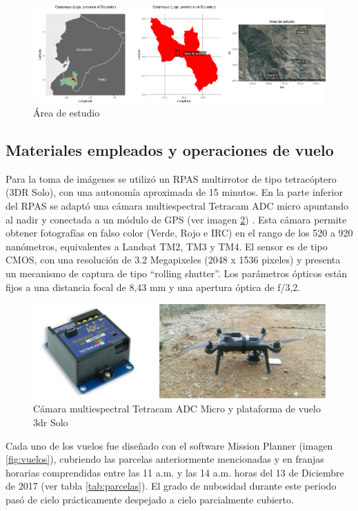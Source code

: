\documentclass[spanish,openany]{article}
\begin{document}
\begin{figure}[H]
\includegraphics[width=1\linewidth,height=1\textheight]{figures/mapa_area_estudio} \caption{Área de estudio}\label{fig:areaEstudio}
\end{figure}

\subsection{Materiales empleados y operaciones de
vuelo}\label{materiales-empleados-y-operaciones-de-vuelo}

Para la toma de imágenes se utilizó un RPAS multirrotor de tipo
tetracóptero (3DR Solo), con una autonomía aproximada de 15 minutos. En
la parte inferior del RPAS se adaptó una cámara multiespectral Tetracam
ADC micro apuntando al nadir y conectada a un módulo de GPS (ver imagen
\ref{fig:camRPAS}) . Esta cámara permite obtener fotografías en falso
color (Verde, Rojo e IRC) en el rango de los 520 a 920 nanómetros,
equivalentes a Landsat TM2, TM3 y TM4. El sensor es de tipo CMOS, con
una resolución de 3.2 Megapixeles (2048 x 1536 pixeles) y presenta un
mecanismo de captura de tipo ``rolling shutter''. Los parámetros ópticos
están fijos a una distancia focal de 8,43 mm y una apertura óptica de
f/3,2.

\begin{figure}[H]
\includegraphics[width=1\linewidth,height=1\textheight]{figures/camera3drsolo} \caption{Cámara multiespectral Tetracam ADC Micro y plataforma de vuelo 3dr Solo}\label{fig:camRPAS}
\end{figure}

Cada uno de los vuelos fue diseñado con el software Mission Planner
(imagen \ref{fig:vuelos}), cubriendo las parcelas anteriormente
mencionadas y en franjas horarias comprendidas entre las 11 a.m. y las
14 a.m. horas del 13 de Diciembre de 2017 (ver tabla
\ref{tab:parcelas}). El grado de nubosidad durante este periodo pasó de
cielo prácticamente despejado a cielo parcialmente cubierto.
\end{document}
